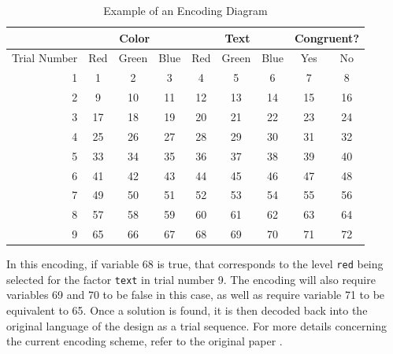 \begin{table}[htb]
  \centering
  \caption{Example of an Encoding Diagram}
\begin{tabular}{|r|c|c|c|c|c|c|c|c|}
\hline
\multicolumn{1}{|l|}{}             & \multicolumn{3}{c|}{Color} & \multicolumn{3}{c|}{Text} & \multicolumn{2}{c|}{Congruent?} \\ \hline
\multicolumn{1}{|l|}{Trial Number} & Red    & Green    & Blue   & Red    & Green   & Blue   & Yes             & No            \\ \hline
1                                  & 1      & 2        & 3      & 4      & 5       & 6      & 7               & 8             \\ \hline
2                                  & 9      & 10       & 11     & 12     & 13      & 14     & 15              & 16            \\ \hline
3                                  & 17     & 18       & 19     & 20     & 21      & 22     & 23              & 24            \\ \hline
4                                  & 25     & 26       & 27     & 28     & 29      & 30     & 31              & 32            \\ \hline
5                                  & 33     & 34       & 35     & 36     & 37      & 38     & 39              & 40            \\ \hline
6                                  & 41     & 42       & 43     & 44     & 45      & 46     & 47              & 48            \\ \hline
7                                  & 49     & 50       & 51     & 52     & 53      & 54     & 55              & 56            \\ \hline
8                                  & 57     & 58       & 59     & 60     & 61      & 62     & 63              & 64            \\ \hline
9                                  & 65     & 66       & 67     & 68     & 69      & 70     & 71              & 72            \\ \hline
\end{tabular}
\label{tab:encoding_diagram}
\end{table}

In this encoding, if variable 68 is true, that corresponds to the level \texttt{red} being selected for the factor \texttt{text} in trial number 9. The encoding will also require variables 69 and 70 to be false in this case, as well as require variable 71 to be equivalent to 65. Once a solution is found, it is then decoded back into the original language of the design as a trial sequence. For more details concerning the current encoding scheme, refer to the original paper \cite{annie}.


